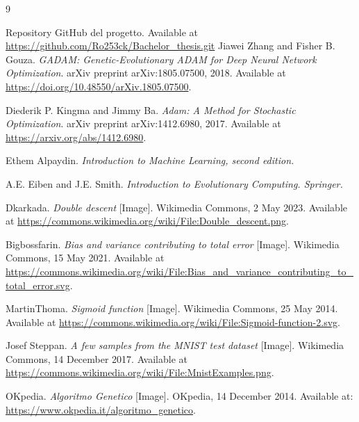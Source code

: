 \documentclass[12pt,a4paper,onecolumn,openright]{book}
\begin{document}
\begin{thebibliography}{9}

  Repository GitHub del progetto. Available at \url{https://github.com/Ro253ck/Bachelor_thesis.git}
  Jiawei Zhang and Fisher B. Gouza.
  \textit{GADAM: Genetic-Evolutionary ADAM for Deep Neural Network Optimization}. 
  arXiv preprint arXiv:1805.07500, 2018.
  Available at \url{https://doi.org/10.48550/arXiv.1805.07500}.
  
  Diederik P. Kingma and Jimmy Ba.
  \textit{Adam: A Method for Stochastic Optimization}.
  arXiv preprint arXiv:1412.6980, 2017.
  Available at \url{https://arxiv.org/abs/1412.6980}.
  
  Ethem Alpaydin.
  \textit{Introduction to Machine Learning, second edition.}

  A.E. Eiben and J.E. Smith.
  \textit{Introduction to Evolutionary Computing. Springer.}

  Dkarkada.
  \textit{Double descent} [Image]. Wikimedia Commons, 2 May 2023. 
  Available at \url{https://commons.wikimedia.org/wiki/File:Double_descent.png}.

  Bigbossfarin.
  \textit{Bias and variance contributing to total error} [Image]. Wikimedia Commons, 15 May 2021. 
  Available at \url{https://commons.wikimedia.org/wiki/File:Bias_and_variance_contributing_to_total_error.svg}.

  MartinThoma.
  \textit{Sigmoid function} [Image]. Wikimedia Commons, 25 May 2014. 
  Available at \url{https://commons.wikimedia.org/wiki/File:Sigmoid-function-2.svg}.

  Josef Steppan.
  \textit{A few samples from the MNIST test dataset} [Image]. Wikimedia Commons, 14 December 2017. 
  Available at \url{https://commons.wikimedia.org/wiki/File:MnistExamples.png}.

  OKpedia.
  \textit{Algoritmo Genetico} [Image]. OKpedia, 14 December 2014. 
  Available at: \url{https://www.okpedia.it/algoritmo_genetico}.

\end{thebibliography}
  
\end{document}
